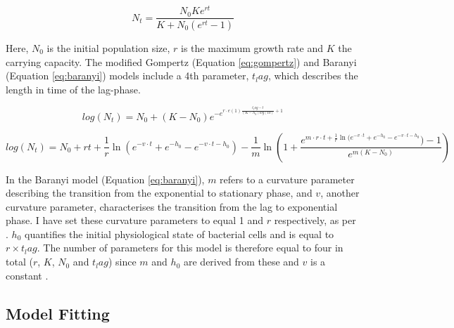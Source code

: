 \documentclass[11pt]{article}
\begin{document}
\begin{linenumbers}
            \begin{equation}
                N_t = \frac{N_0 K e^{rt}}{K + N_0 (e^{rt} - 1)}
                \label{eq:logistic}
            \end{equation}
            
            Here, $N_0$ is the initial population size, $r$ is the maximum growth rate and $K$ the carrying capacity. The modified Gompertz (Equation \ref{eq:gompertz}) and Baranyi (Equation \ref{eq:baranyi}) models include a 4th parameter, $t_lag$, which describes the length in time of the lag-phase.
            
            \begin{equation}
                log(N_t) = N_0 + (K - N_0) e^{-e^{r \cdot e(1) \frac{t_lag - t}{(K - N_0) log(10)}+1}}
                \label{eq:gompertz}
            \end{equation}
            
            \begin{equation}
                log(N_t) = N_0 + r t + \frac{1}{r} \ln(e^{-v \cdot t} + e^{-h_0} - e^{-v \cdot t -h_0}) - \frac{1}{m} \ln(1 + \frac{e^{m \cdot r \cdot t + \frac{1}{r} \ln(e^{-v \cdot t} + e^{-h_0} - e^{-v \cdot t -h_0}}) - 1}{e^{m(K - N_0)}})
                \label{eq:baranyi}
            \end{equation}
            
            In the Baranyi model (Equation \ref{eq:baranyi}), $m$ refers to a curvature parameter describing the transition from the exponential to stationary phase, and $v$, another curvature parameter, characterises the transition from the lag to exponential phase. I have set these curvature parameters to equal 1 and $r$ respectively, as per \cite{baranyi_simple_1997}. $h_0$ quantifies the initial physiological state of bacterial cells and is equal to $r \times t_lag$. The number of parameters for this model is therefore equal to four in total ($r$, $K$, $N_0$ and $t_lag$) since $m$ and $h_0$ are derived from these and $v$ is a constant \citep{grijspeerdt_estimating_1999}. 


        \subsection{Model Fitting}
        

\end{linenumbers}
\end{document}
